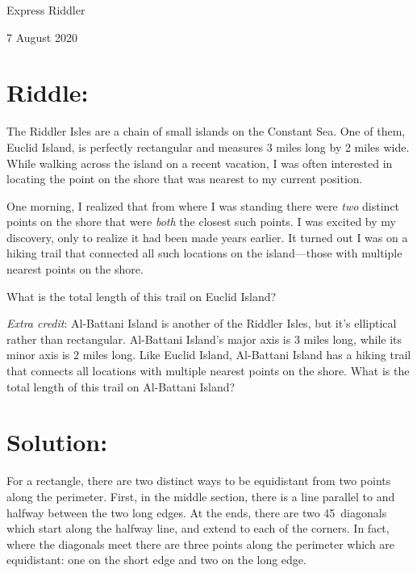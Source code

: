 \documentclass{article}
\begin{document}
\pagestyle{empty} %

\begin{center}
{\LARGE Express Riddler}

\vspace{0.15in}

{\Large 7 August 2020}
\end{center}


\section*{Riddle:}

The Riddler Isles are a chain of small islands on the Constant Sea.
One of them, Euclid Island, is perfectly rectangular and measures 3 miles long by 2 miles wide.
While walking across the island on a recent vacation, I was often interested in locating the point on the shore that was nearest to my current position.

One morning, I realized that from where I was standing there were \textit{two} distinct points on the shore that were \textit{both} the closest such points.
I was excited by my discovery, only to realize it had been made years earlier.
It turned out I was on a hiking trail that connected all such locations on the island---those with multiple nearest points on the shore.

What is the total length of this trail on Euclid Island?

\textit{Extra credit}: Al-Battani Island is another of the Riddler Isles, but it’s elliptical rather than rectangular. Al-Battani Island’s major axis is 3 miles long, while its minor axis is 2 miles long. Like Euclid Island, Al-Battani Island has a hiking trail that connects all locations with multiple nearest points on the shore. What is the total length of this trail on Al-Battani Island?

\section*{Solution:}

For a rectangle, there are two distinct ways to be equidistant from two points along the perimeter.
First, in the middle section, there is a line parallel to and halfway between the two long edges.
At the ends, there are two 45\textdegree\ diagonals which start along the halfway line, and extend to each of the corners.
In fact, where the diagonals meet there are three points along the perimeter which are equidistant: one on the short edge and two on the long edge.
\end{document}
